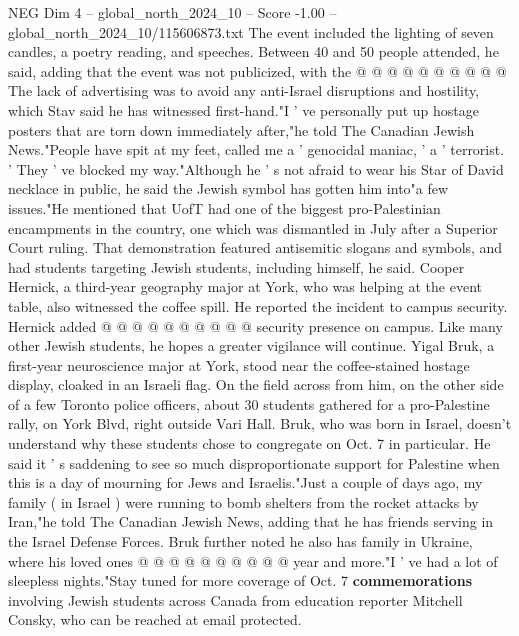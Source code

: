 \begin{textsample}{NEG Dim 4 – global\_north\_2024\_10 – Score -1.00 – global\_north\_2024\_10/115606873.txt}
The event included the lighting of seven candles, a poetry reading, and speeches.
Between 40 and 50 people attended, he said, adding that the event was not publicized, with the @ @ @ @ @ @ @ @ @ @ The lack of advertising was to avoid any anti-Israel disruptions and hostility, which Stav said he has witnessed first-hand."I ' ve personally put up hostage posters that are torn down immediately after,"he told The Canadian Jewish News."People have spit at my feet, called me a ' genocidal maniac, ' a ' terrorist. ' They ' ve blocked my way."Although he ' s not afraid to wear his Star of David necklace in public, he said the Jewish symbol has gotten him into"a few issues."He mentioned that UofT had one of the biggest pro-Palestinian encampments in the country, one which was dismantled in July after a Superior Court ruling.
That demonstration featured antisemitic slogans and symbols, and had students targeting Jewish students, including himself, he said.
Cooper Hernick, a third-year geography major at York, who was helping at the event table, also witnessed the coffee spill.
He reported the incident to campus security.
Hernick added @ @ @ @ @ @ @ @ @ @ security presence on campus.
Like many other Jewish students, he hopes a greater vigilance will continue.
Yigal Bruk, a first-year neuroscience major at York, stood near the coffee-stained hostage display, cloaked in an Israeli flag.
On the field across from him, on the other side of a few Toronto police officers, about 30 students gathered for a pro-Palestine rally, on York Blvd, right outside Vari Hall.
Bruk, who was born in Israel, doesn't understand why these students chose to congregate on Oct. 7 in particular.
He said it ' s saddening to see so much disproportionate support for Palestine when this is a day of mourning for Jews and Israelis."Just a couple of days ago, my family ( in Israel ) were running to bomb shelters from the rocket attacks by Iran,"he told The Canadian Jewish News, adding that he has friends serving in the Israel Defense Forces.
Bruk further noted he also has family in Ukraine, where his loved ones @ @ @ @ @ @ @ @ @ @ year and more."I ' ve had a lot of sleepless nights."Stay tuned for more coverage of Oct. 7 \textbf{commemorations} involving Jewish students across Canada from education reporter Mitchell Consky, who can be reached at email protected.

\end{textsample}

